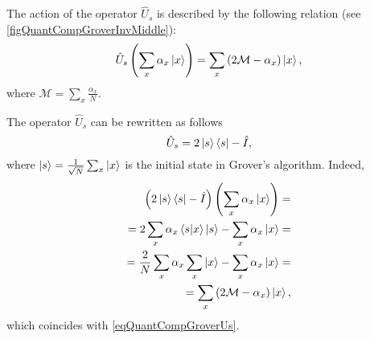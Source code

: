 

The action of the operator $\hat{U}_s$ is described by the following relation
(see \autoref{figQuantCompGroverInvMiddle}):
\begin{equation}
\hat{U}_s\left(\sum_x \alpha_x \ket{x}\right) = 
\sum_x \left(2 \mathcal{M} - \alpha_x \right)\ket{x},
\label{eqQuantCompGroverUs}
\end{equation} 
where $\mathcal{M} = \sum_x \frac{\alpha_x}{N}$.

The operator $\hat{U}_s$ can be rewritten as follows
\begin{equation}
\hat{U}_s = 
2 \ket{s}\bra{s} - \hat{I},
\nonumber
\end{equation}
where $\ket{s}=\frac{1}{\sqrt{N}}\sum_x \ket{x}$ is the initial state in Grover's algorithm.
Indeed,
\begin{eqnarray}
\left(2 \ket{s}\bra{s} - \hat{I}\right)
\left(\sum_x \alpha_x \ket{x}\right) =
\nonumber \\
=  2 \sum_x \alpha_x \bra{s}\ket{x} \ket{s} 
- \sum_x \alpha_x \ket{x} = 
\nonumber \\
=
\frac{2}{N} \sum_x \alpha_x \sum_x \ket{x} -
\sum_x \alpha_x \ket{x} = 
\nonumber \\
= \sum_x \left( 2 \mathcal{M} -\alpha_x \right) \ket{x},
\nonumber
\end{eqnarray}
which coincides with \eqref{eqQuantCompGroverUs}.



